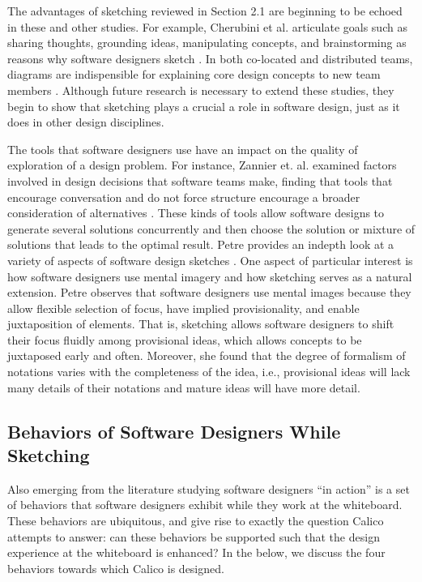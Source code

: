 The advantages of sketching reviewed in Section 2.1 are beginning to be echoed in these and other studies. For example, Cherubini et al. articulate goals such as sharing thoughts, grounding ideas, manipulating concepts, and brainstorming as reasons why software designers sketch \citep{Cherubini}. In both co-located and distributed teams, diagrams are indispensible for explaining core design concepts to new team members \citep{Yatani}. Although future research is necessary to extend these studies, they begin to show that sketching plays a crucial a role in software design, just as it does in other design disciplines.

The tools that software designers use have an impact on the quality of exploration of a design problem. For instance, Zannier et. al. examined factors involved in design decisions that software teams make, finding that tools that encourage conversation and do not force structure encourage a broader consideration of alternatives \citep{Zannier}. These kinds of tools allow software designs to generate several solutions concurrently and then choose the solution or mixture of solutions that leads to the optimal result. 
Petre provides an indepth look at a variety of aspects of software design sketches \citep{Petre}. One aspect of particular interest is how software designers use mental imagery and how sketching serves as a natural extension. Petre observes that software designers use mental images because they allow flexible selection of focus, have implied provisionality, and enable juxtaposition of elements. That is, sketching allows software designers to shift their focus fluidly among provisional ideas, which allows concepts to be juxtaposed early and often. Moreover, she found that the degree of formalism of notations varies with the completeness of the idea, i.e., provisional ideas will lack many details of their notations and mature ideas will have more detail.

\subsection{Behaviors of Software Designers While Sketching}
\label{behaviorsofsoftwaredesignerswhilesketching}
Also emerging from the literature studying software designers ``in action'' is a set of behaviors that software designers exhibit while they work at the whiteboard. These behaviors are ubiquitous, and give rise to exactly the question Calico attempts to answer: can these behaviors be supported such that the design experience at the whiteboard is enhanced? In the below, we discuss the four behaviors towards which Calico is designed.

